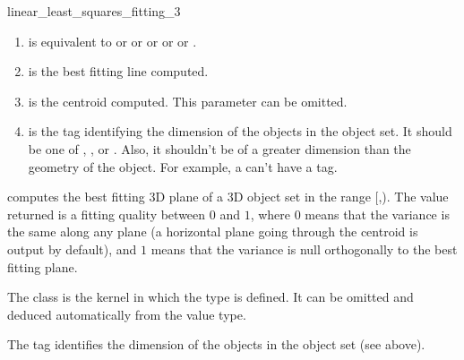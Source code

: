 \begin{ccRefFunction}{linear_least_squares_fitting_3}

\begin{enumerate}
   \item  {} is equivalent to  or
           or  or  or
           or .
   \item  {} is the best fitting line computed.
   \item  {} is the centroid computed. This parameter can be
          omitted.
   \item  {} is the tag identifying the dimension of the objects in the object set. It should be one of , ,  or . Also, it shouldn't be of a greater dimension than the geometry of the object. For example, a  can't have a  tag.
\end{enumerate}


{ computes the best fitting 3D plane of a 3D object set in the range
[,). The value returned is a fitting quality
between $0$ and $1$, where $0$ means that the variance is the same
along any plane (a horizontal plane going through the centroid is output
by default), and $1$ means that the variance is null orthogonally
to the best fitting plane. }

The class  is the kernel in which the type
 is defined. It can be omitted and
deduced automatically from the value type.

The tag  identifies the dimension of the objects in the object set (see above). 



\end{ccRefFunction}
